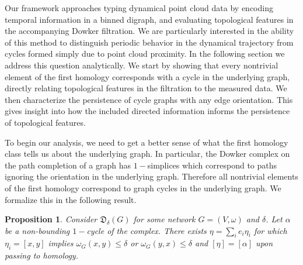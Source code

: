 \documentclass[pdflatex,bst/sn-mathphys-num]{sn-jnl}%
\theoremstyle{thmstyleone}%
\newtheorem{prop}[theorem]{Proposition}%
\theoremstyle{definition}
\theoremstyle{thmstyletwo}%
\newcommand{\FD}{\mathfrak{D}}
\theoremstyle{thmstylethree}%
\begin{document}
Our framework approaches typing dynamical point cloud data by encoding temporal information in a binned digraph, and evaluating topological features in the accompanying Dowker filtration. We are particularly interested in the ability of this method to distinguish periodic behavior in the dynamical trajectory from cycles formed simply due to point cloud proximity. In the following section we address this question analytically. We start by showing that every nontrivial element of the first homology corresponds with a cycle in the underlying graph, directly relating topological features in the filtration to the measured data. We then characterize the persistence of cycle graphs with any edge orientation. This gives insight into how the included directed information informs the persistence of topological features.


To begin our analysis, we need to get a better sense of what the first homology class tells us about the underlying graph. In particular, the Dowker complex on the path completion of a graph has $1-$simplices which correspond to paths ignoring the orientation in the underlying graph. Therefore all nontrivial elements of the first homology correspond to graph cycles in the underlying graph. We formalize this in the following result. 

\begin{prop}\label{prop:hom_to_bdry}
    Consider $\FD_\delta(G)$ for some network $G=(V,\omega)$ and $\delta$. Let $\alpha$ be a non-bounding $1-$cycle of the complex. There exists $\eta=\sum_{i}e_i\eta_i$ for which $\eta_i=[x,y]$ implies $\omega_{G}(x,y)\leq \delta$ or $\omega_G(y,x)\leq \delta$ and $[\eta]=[\alpha]$ upon passing to homology.
\end{prop}
\end{document}
